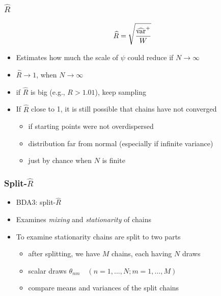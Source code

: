 \documentclass[10pt,handout]{beamer}
\begin{document}
\begin{frame}

\frametitle{ $\widehat{R}$}

  \begin{equation*}
      \widehat{R}=\sqrt{\frac{\widehat{\mathrm{var}}^{+}}{W}}
    \end{equation*}
    \begin{itemize}
    \item<1-> Estimates how much the scale of $\psi$ could reduce if $N\rightarrow\infty$
    \item<1-> $\widehat{R}\rightarrow 1$, when $N\rightarrow\infty$
    \item<1-> if $\widehat{R}$ is big (e.g., $R>1.01$), keep sampling
    \item<2-> If $\widehat{R}$ close to 1, it is still possible that chains have not converged
      \begin{itemize}
      \item if starting points were not overdispersed
      \item distribution far from normal (especially if infinite variance)
      \item just by chance when $N$ is finite
      \end{itemize}
    \end{itemize}

\end{frame}

\begin{frame}[fragile]

\frametitle{ Split-$\widehat{R}$}

  \begin{itemize}
  \item BDA3: split-$\widehat{R}$
  \item Examines {\it mixing} and {\it stationarity} of chains
  \item To examine stationarity chains are split to two parts
    \begin{itemize}
    \item after splitting, we have $M$ chains, each having $N$ draws
    \item scalar draws $\theta_{nm} \quad (n=1,\ldots,N;m=1,\ldots,M)$
    \item compare means and variances of the split chains
    \end{itemize}
  \end{itemize}

\end{frame}
\end{document}
